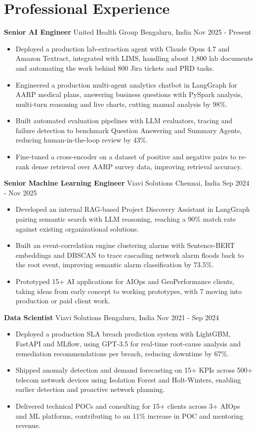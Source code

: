\documentclass[10pt,a4paper]{article}
\newcommand{\role}[4]{\textbf{#1} \textbar{} #2 \hfill #3 \textbar{} #4\par}
\begin{document}
\section{Professional Experience}
\role{Senior AI Engineer}{United Health Group}{Bengaluru, India}{Nov 2025 - Present}
\begin{itemize}
  \item Deployed a production lab-extraction agent with Claude Opus 4.7 and Amazon Textract, integrated with LIMS, handling about 1,800 lab documents and automating the work behind 800 Jira tickets and PRD tasks.
  \item Engineered a production multi-agent analytics chatbot in LangGraph for AARP medical plans, answering business questions with PySpark analysis, multi-turn reasoning and live charts, cutting manual analysis by 98\%.
  \item Built automated evaluation pipelines with LLM evaluators, tracing and failure detection to benchmark Question Answering and Summary Agents, reducing human-in-the-loop review by 43\%.
  \item Fine-tuned a cross-encoder on a dataset of positive and negative pairs to re-rank dense retrieval over AARP survey data, improving retrieval accuracy.
\end{itemize}
\vspace{3pt}
\role{Senior Machine Learning Engineer}{Viavi Solutions}{Chennai, India}{Sep 2024 - Nov 2025}
\begin{itemize}
  \item Developed an internal RAG-based Project Discovery Assistant in LangGraph pairing semantic search with LLM reasoning, reaching a 90\% match rate against existing organizational solutions.
  \item Built an event-correlation engine clustering alarms with Sentence-BERT embeddings and DBSCAN to trace cascading network alarm floods back to the root event, improving semantic alarm classification by 73.5\%.
  \item Prototyped 15+ AI applications for AIOps and GeoPerformance clients, taking ideas from early concept to working prototypes, with 7 moving into production or paid client work.
\end{itemize}
\vspace{3pt}
\role{Data Scientist}{Viavi Solutions}{Bengaluru, India}{Nov 2021 - Sep 2024}
\begin{itemize}
  \item Deployed a production SLA breach prediction system with LightGBM, FastAPI and MLflow, using GPT-3.5 for real-time root-cause analysis and remediation recommendations per breach, reducing downtime by 67\%.
  \item Shipped anomaly detection and demand forecasting on 15+ KPIs across 500+ telecom network devices using Isolation Forest and Holt-Winters, enabling earlier detection and proactive network planning.
  \item Delivered technical POCs and consulting for 15+ clients across 3+ AIOps and ML platforms, contributing to an 11\% increase in POC and mentoring revenue.
\end{itemize}
\end{document}
